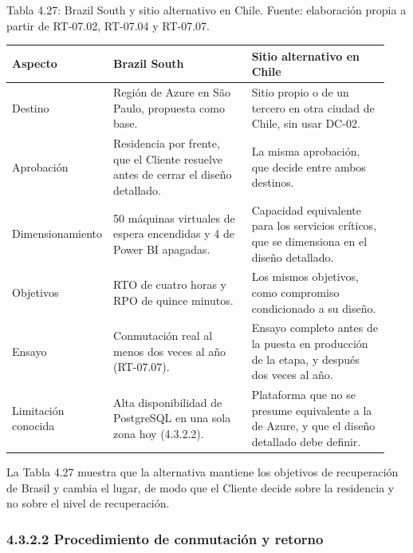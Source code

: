 \documentclass[11pt]{article}
\begin{document}
\par\vspace{0pt plus 10\baselineskip}\vspace{0pt plus -10\baselineskip}

Tabla 4.27: Brazil South y sitio alternativo en Chile. Fuente: elaboración propia a partir de RT-07.02, RT-07.04 y RT-07.07.\par\nopagebreak
\begin{longtable}{@{}p{0.18\linewidth}p{0.38\linewidth}p{0.38\linewidth}@{}}
\toprule Aspecto & Brazil South & Sitio alternativo en Chile \\
\midrule\endhead\bottomrule\endlastfoot
Destino & Región de Azure en São Paulo, propuesta como base. & Sitio propio o de un tercero en otra ciudad de Chile, sin usar DC-02. \\
Aprobación & Residencia por frente, que el Cliente resuelve antes de cerrar el diseño detallado. & La misma aprobación, que decide entre ambos destinos. \\
Dimensionamiento & 50 máquinas virtuales de espera encendidas y 4 de Power BI apagadas. & Capacidad equivalente para los servicios críticos, que se dimensiona en el diseño detallado. \\
Objetivos & RTO de cuatro horas y RPO de quince minutos. & Los mismos objetivos, como compromiso condicionado a su diseño. \\
Ensayo & Conmutación real al menos dos veces al año (RT-07.07). & Ensayo completo antes de la puesta en producción de la etapa, y después dos veces al año. \\
Limitación conocida & Alta disponibilidad de PostgreSQL en una sola zona hoy (4.3.2.2). & Plataforma que no se presume equivalente a la de Azure, y que el diseño detallado debe definir. \\
\end{longtable}

La Tabla 4.27 muestra que la alternativa mantiene los objetivos de recuperación de Brasil y cambia el lugar, de modo que el Cliente decide sobre la residencia y no sobre el nivel de recuperación.


\subsubsection{4.3.2.2 Procedimiento de conmutación y retorno}
\end{document}
